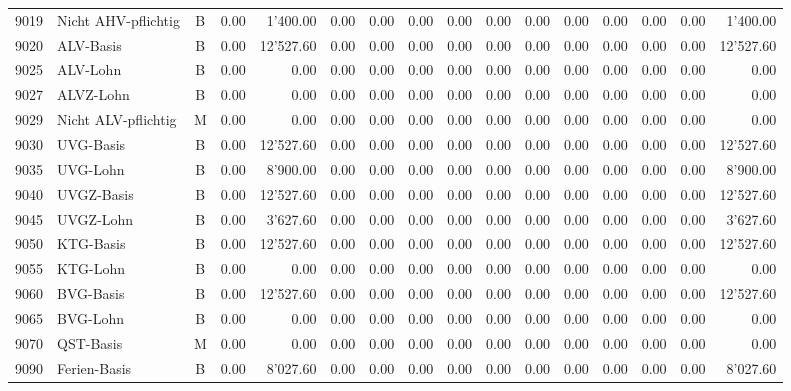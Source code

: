\documentclass[8pt,a4paper]{extarticle}
\begin{document}
\begin{longtable}{@{\extracolsep{\fill}} !{\vrule width -1pt}l !{\vrule width -5pt}l c r r r r !{\vrule width -1pt}r !{\vrule width -1pt}r !{\vrule width -1pt}r r r r r r r}
9019&Nicht AHV-pflichtig&B&0.00&1'400.00&0.00&0.00&0.00&0.00&0.00&0.00&0.00&0.00&0.00&0.00&1'400.00\\
9020&ALV-Basis&B&0.00&12'527.60&0.00&0.00&0.00&0.00&0.00&0.00&0.00&0.00&0.00&0.00&12'527.60\\
9025&ALV-Lohn&B&0.00&0.00&0.00&0.00&0.00&0.00&0.00&0.00&0.00&0.00&0.00&0.00&0.00\\
9027&ALVZ-Lohn&B&0.00&0.00&0.00&0.00&0.00&0.00&0.00&0.00&0.00&0.00&0.00&0.00&0.00\\
9029&Nicht ALV-pflichtig&M&0.00&0.00&0.00&0.00&0.00&0.00&0.00&0.00&0.00&0.00&0.00&0.00&0.00\\
9030&UVG-Basis&B&0.00&12'527.60&0.00&0.00&0.00&0.00&0.00&0.00&0.00&0.00&0.00&0.00&12'527.60\\
9035&UVG-Lohn&B&0.00&8'900.00&0.00&0.00&0.00&0.00&0.00&0.00&0.00&0.00&0.00&0.00&8'900.00\\
9040&UVGZ-Basis&B&0.00&12'527.60&0.00&0.00&0.00&0.00&0.00&0.00&0.00&0.00&0.00&0.00&12'527.60\\
9045&UVGZ-Lohn&B&0.00&3'627.60&0.00&0.00&0.00&0.00&0.00&0.00&0.00&0.00&0.00&0.00&3'627.60\\
9050&KTG-Basis&B&0.00&12'527.60&0.00&0.00&0.00&0.00&0.00&0.00&0.00&0.00&0.00&0.00&12'527.60\\
9055&KTG-Lohn&B&0.00&0.00&0.00&0.00&0.00&0.00&0.00&0.00&0.00&0.00&0.00&0.00&0.00\\
9060&BVG-Basis&B&0.00&12'527.60&0.00&0.00&0.00&0.00&0.00&0.00&0.00&0.00&0.00&0.00&12'527.60\\
9065&BVG-Lohn&B&0.00&0.00&0.00&0.00&0.00&0.00&0.00&0.00&0.00&0.00&0.00&0.00&0.00\\
9070&QST-Basis&M&0.00&0.00&0.00&0.00&0.00&0.00&0.00&0.00&0.00&0.00&0.00&0.00&0.00\\
9090&Ferien-Basis&B&0.00&8'027.60&0.00&0.00&0.00&0.00&0.00&0.00&0.00&0.00&0.00&0.00&8'027.60\\

\end{longtable}
\pagebreak
\setlength{\tabcolsep}{0pt}
\end{document}
